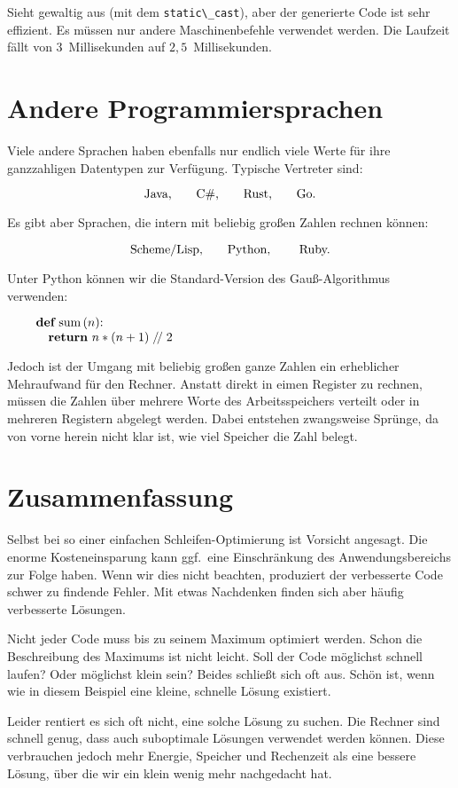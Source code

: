 Sieht gewaltig aus (mit dem \lstinline{static\_cast}), aber
der generierte Code ist sehr effizient.
Es müssen nur andere Maschinenbefehle verwendet werden.
Die Laufzeit fällt von 3~Millisekunden auf $2{,}5$~Millisekunden.

\section{Andere Programmiersprachen}%
%
Viele andere Sprachen haben ebenfalls nur endlich viele Werte für ihre
ganzzahligen Datentypen zur Verfügung.
Typische Vertreter sind:

$$\hbox{Java,\qquad C\#,\qquad Rust,\qquad Go.}$$

\noindent Es gibt aber Sprachen, die intern mit beliebig großen
Zahlen rechnen können:

$$\hbox{Scheme/Lisp,\qquad Python, \qquad Ruby.}$$

\noindent Unter Python können wir die Standard-Version des Gauß-Algorithmus verwenden:

$$\vbox{\obeylines
{\bf def} sum$\,$($n$):
\quad {\bf return} $n * (n + 1) \mathrel{/\!/} 2$
}$$

\noindent Jedoch ist der Umgang mit beliebig großen ganze Zahlen
ein erheblicher Mehraufwand für den Rechner.
Anstatt direkt in eimen Register zu rechnen, müssen die
Zahlen über mehrere Worte des Arbeitsspeichers verteilt
oder in mehreren Registern abgelegt werden.
Dabei entstehen zwangsweise Sprünge, da von vorne herein
nicht klar ist, wie viel Speicher die Zahl belegt.

\section{Zusammenfassung}%
%
Selbst bei so einer einfachen Schleifen-Optimierung ist
Vorsicht angesagt.
Die enorme Kosteneinsparung kann ggf.\ eine Einschränkung
des Anwendungsbereichs zur Folge haben.
Wenn wir dies nicht beachten, produziert der verbesserte
Code schwer zu findende Fehler.
Mit etwas Nachdenken finden sich aber häufig verbesserte
Lösungen.

Nicht jeder Code muss bis zu seinem Maximum optimiert
werden.
Schon die Beschreibung des Maximums ist nicht leicht.
Soll der Code möglichst schnell laufen?
Oder möglichst klein sein?
Beides schließt sich oft aus.
Schön ist, wenn wie in diesem Beispiel eine kleine,
schnelle Lösung existiert.

Leider rentiert es sich oft nicht, eine solche Lösung
zu suchen.
Die Rechner sind schnell genug, dass auch suboptimale
Lösungen verwendet werden können.
Diese verbrauchen jedoch mehr Energie, Speicher und
Rechenzeit als eine bessere Lösung, über die wir ein
klein wenig mehr nachgedacht hat.

